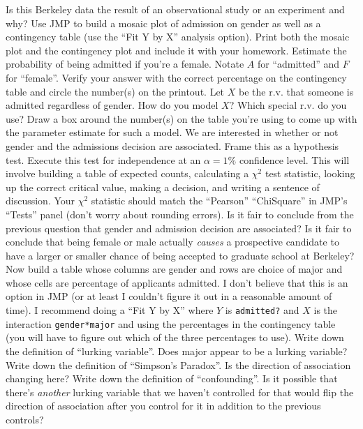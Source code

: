 \documentclass[12pt]{article}
\begin{document}
\easysubproblem Is this Berkeley data the result of an observational study or an experiment and why?
\easysubproblem Use JMP to build a mosaic plot of admission on gender as well as a contingency table (use the ``Fit Y by X'' analysis option). Print both the mosaic plot and the contingency plot and include it with your homework.
\easysubproblem Estimate the probability of being admitted if you're a female. Notate $A$ for ``admitted'' and $F$ for ``female''. Verify your answer with the correct percentage on the contingency table and circle the number(s) on the printout.
\easysubproblem Let $X$ be the r.v. that someone is admitted regardless of gender. How do you model $X$? Which special r.v. do you use? Draw a box around the number(s) on the table you're using to come up with the parameter estimate for such a model.
\easysubproblem We are interested in whether or not gender and the admissions decision are associated. Frame this as a hypothesis test.
\hardsubproblem Execute this test for independence at an $\alpha = 1\%$ confidence level. This will involve building a table of expected counts, calculating a $\chi^2$ test statistic, looking up the correct critical value, making a decision, and writing a sentence of discussion. Your $\chi^2$ statistic should match the ``Pearson'' ``ChiSquare'' in JMP's ``Tests'' panel (don't worry about rounding errors).
\easysubproblem Is it fair to conclude from the previous question that gender and admission decision are associated? Is it fair to conclude that being female or male actually \textit{causes} a prospective candidate to have a larger or smaller chance of being accepted to graduate school at Berkeley?
\intermediatesubproblem Now build a table whose columns are gender and rows are choice of major and whose cells are percentage of applicants admitted. I don't believe that this is an option in JMP (or at least I couldn't figure it out in a reasonable amount of time). I recommend doing a ``Fit Y by X'' where $Y$ is \texttt{admitted?} and $X$ is the interaction \texttt{gender*major} and using the percentages in the contingency table (you will have to figure out which of the three percentages to use).
\easysubproblem Write down the definition of ``lurking variable''. Does major appear to be a lurking variable?
\easysubproblem Write down the definition of ``Simpson's Paradox''. Is the direction of association changing here?
\easysubproblem Write down the definition of ``confounding''.
\intermediatesubproblem Is it possible that there's \textit{another} lurking variable that we haven't controlled for that would flip the direction of association after you control for it in addition to the previous controls?
\eenum
\end{document}

